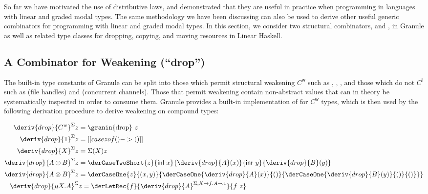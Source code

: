 So far we have motivated the use of distributive laws, and
demonstrated that they are useful in practice when programming in
languages with linear and graded modal types.
The same methodology we have been discussing can also be used to
derive other useful generic combinators for programming with linear
and graded modal types. In this section, we consider two structural
combinators,  and , in Granule as well
as related type classes for dropping, copying, and moving resources in Linear Haskell.

\subsection{A Combinator for Weakening (``drop'')}
\label{subsec:drop}

%
The built-in type constants of Granule can be split into those
which permit structural weakening $C^{\mathsf{w}}$ such as
, , , and those which do not
$C^{\mathsf{l}}$ such as  (file handles) and
 (concurrent channels). Those that
permit weakening contain non-abstract values that
can in theory be systematically inspected in order to consume them.
Granule provides a built-in implementation of 
for $C^{\mathsf{w}}$ types, which is then used by the following derivation
procedure to derive weakening on compound types:

\begin{align*}
    \deriv{drop}{C^w}^\Sigma z & = \text{\granin{drop} $z$} \\
    \deriv{drop}{1}^\Sigma z & = [[ case z of () -> () ]] \\
    \deriv{drop}{X}^\Sigma z & = \Sigma(X) z \\
    \deriv{drop}{A \oplus B}^\Sigma z & =
    \derCaseTwoShort{z}{\mathsf{inl}\ x}{\deriv{drop}{A}(x)}{\mathsf{inr}\ y}
                                {\deriv{drop}{B}(y)}\\
    \deriv{drop}{A \otimes B}^\Sigma z & =
    \derCaseOne{z}{(x, y)}
       {\derCaseOne{\deriv{drop}{A}(x)}{()}
         {\derCaseOne{\deriv{drop}{B}(y)}{()}{()}}}
    \\
    \deriv{drop}{\mu X . A}^\Sigma & z =
                                     \derLetRec{f}{\deriv{drop}{A}^{\Sigma,
                                     X \mapsto f : A \multimap 1}}{f\ z}
    \end{align*}

